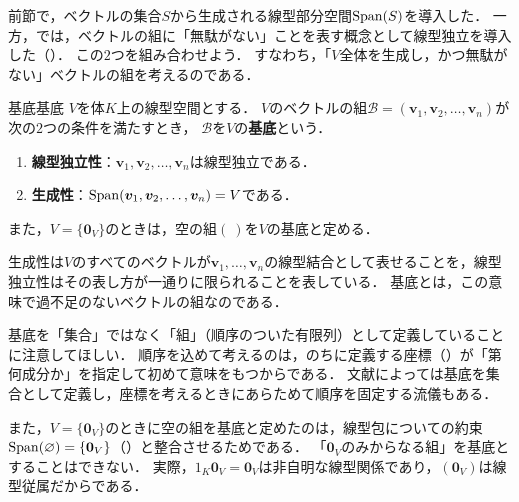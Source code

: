 前節で，ベクトルの集合$S$から生成される線型部分空間$\operatorname{Span}(S)$を導入した．
一方，では，ベクトルの組に「無駄がない」ことを表す概念として線型独立を導入した（）．
この$2$つを組み合わせよう．
すなわち，「$V$全体を生成し，かつ無駄がない」ベクトルの組を考えるのである．

\begin{definition}{基底}{基底}
  $V$を体$K$上の線型空間とする．
  $V$のベクトルの組$\mathcal{B} = (\bm{v}_1, \bm{v}_2, \dots, \bm{v}_n)$が次の$2$つの条件を満たすとき，
  $\mathcal{B}$を$V$の\textbf{基底}という．
  \begin{enumerate}[label=(\roman*),leftmargin=3.2em]
    \item \textbf{線型独立性}：$\bm{v}_1, \bm{v}_2, \dots, \bm{v}_n$は線型独立である．
    \item \textbf{生成性}：$\operatorname{Span}(\bm{v}_1, \bm{v}_2, \dots, \bm{v}_n) = V$である．
  \end{enumerate}
  また，$V = \{\bm{0}_V\}$のときは，空の組$(\ )$を$V$の基底と定める．
\end{definition}

生成性は$V$のすべてのベクトルが$\bm{v}_1, \dots, \bm{v}_n$の線型結合として表せることを，線型独立性はその表し方が一通りに限られることを表している．
基底とは，この意味で過不足のないベクトルの組なのである．

\begin{remark}
  基底を「集合」ではなく「組」（順序のついた有限列）として定義していることに注意してほしい．
  順序を込めて考えるのは，のちに定義する座標（）が「第何成分か」を指定して初めて意味をもつからである．
  文献によっては基底を集合として定義し，座標を考えるときにあらためて順序を固定する流儀もある．

  また，$V = \{\bm{0}_V\}$のときに空の組を基底と定めたのは，線型包についての約束$\operatorname{Span}(\varnothing) = \{\bm{0}_V\}$（）と整合させるためである．
  「$\bm{0}_V$のみからなる組」を基底とすることはできない．
  実際，$1_K \bm{0}_V = \bm{0}_V$は非自明な線型関係であり，$(\bm{0}_V)$は線型従属だからである．
\end{remark}

